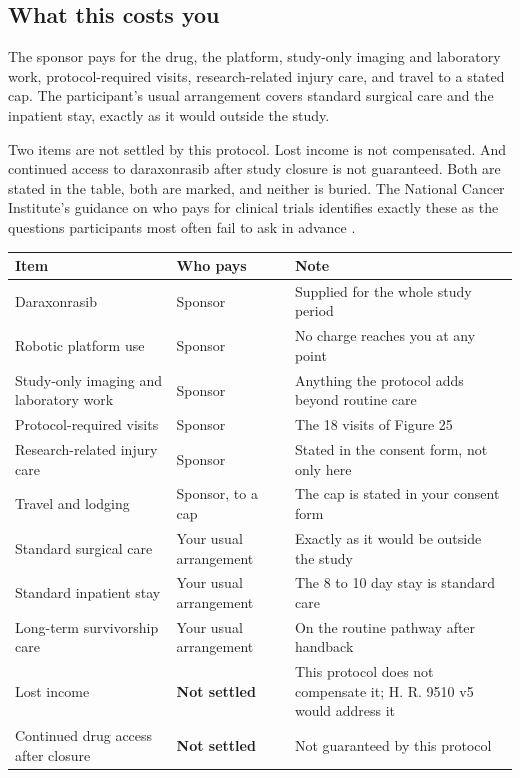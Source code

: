 \vspace{0.30em}

\subsection{What this costs you}

The sponsor pays for the drug, the platform, study-only imaging and laboratory
work, protocol-required visits, research-related injury care, and travel to a
stated cap. The participant's usual arrangement covers standard surgical care
and the inpatient stay, exactly as it would outside the study.

Two items are not settled by this protocol. Lost income is not compensated. And
continued access to daraxonrasib after study closure is not guaranteed. Both are
stated in the table, both are marked, and neither is buried. The National Cancer
Institute's guidance on who pays for clinical trials identifies exactly these as
the questions participants most often fail to ask in advance
\cite{NCICosts2024}.

\vspace{0.30em}

\noindent\begin{tabularx}{\textwidth}{L{5.0cm} L{3.0cm} Y}
\toprule
\textbf{Item} & \textbf{Who pays} & \textbf{Note} \\
\midrule
Daraxonrasib & Sponsor & Supplied for the whole study period \\
Robotic platform use & Sponsor & No charge reaches you at any point \\
Study-only imaging and laboratory work & Sponsor & Anything the protocol adds beyond routine care \\
Protocol-required visits & Sponsor & The 18 visits of Figure 25 \\
Research-related injury care & Sponsor & Stated in the consent form, not only here \\
Travel and lodging & Sponsor, to a cap & The cap is stated in your consent form \\
Standard surgical care & Your usual arrangement & Exactly as it would be outside the study \\
Standard inpatient stay & Your usual arrangement & The 8 to 10 day stay is standard care \\
Long-term survivorship care & Your usual arrangement & On the routine pathway after handback \\
Lost income & \textbf{Not settled} & This protocol does not compensate it; H. R. 9510 v5 would address it \\
Continued drug access after closure & \textbf{Not settled} & Not guaranteed by this protocol \\
\bottomrule
\end{tabularx}

